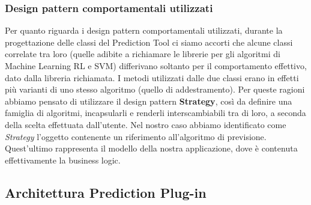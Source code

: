 \subsubsection{Design pattern comportamentali utilizzati}
Per quanto riguarda i design pattern comportamentali utilizzati, durante la progettazione delle classi del Prediction Tool ci siamo accorti che alcune classi correlate tra loro (quelle adibite a richiamare le librerie per gli algoritmi di Machine Learning RL e SVM) differivano soltanto per il comportamento effettivo, dato dalla libreria richiamata. I metodi utilizzati dalle due classi erano in effetti più varianti di uno stesso algoritmo (quello di addestramento). Per queste ragioni abbiamo pensato di utilizzare il design pattern \textbf{Strategy}, così da definire una famiglia di algoritmi, incapsularli e renderli interscambiabili tra di loro, a seconda della scelta effettuata dall’utente.
Nel nostro caso abbiamo identificato come \textit{Strategy} l’oggetto contenente un riferimento all'algoritmo di previsione.
Quest'ultimo rappresenta il modello della nostra applicazione, dove è contenuta effettivamente la business logic.

\pagebreak
\subsection{Architettura Prediction Plug-in}

